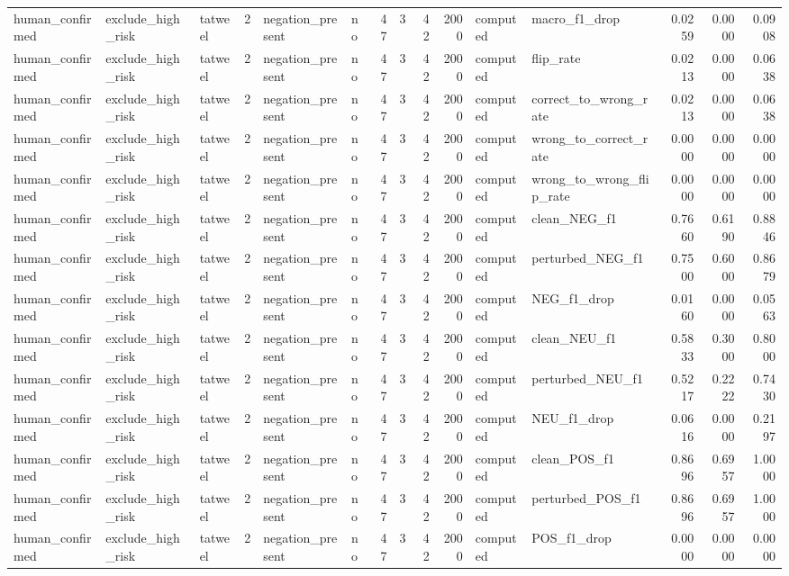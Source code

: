 \begin{tabular}{lllrllrrrrllrrr}
human_confirmed & exclude_high_risk & tatweel & 2 & negation_present & no & 47 & 3 & 42 & 2000 & computed & macro_f1_drop & 0.0259 & 0.0000 & 0.0908 \\
human_confirmed & exclude_high_risk & tatweel & 2 & negation_present & no & 47 & 3 & 42 & 2000 & computed & flip_rate & 0.0213 & 0.0000 & 0.0638 \\
human_confirmed & exclude_high_risk & tatweel & 2 & negation_present & no & 47 & 3 & 42 & 2000 & computed & correct_to_wrong_rate & 0.0213 & 0.0000 & 0.0638 \\
human_confirmed & exclude_high_risk & tatweel & 2 & negation_present & no & 47 & 3 & 42 & 2000 & computed & wrong_to_correct_rate & 0.0000 & 0.0000 & 0.0000 \\
human_confirmed & exclude_high_risk & tatweel & 2 & negation_present & no & 47 & 3 & 42 & 2000 & computed & wrong_to_wrong_flip_rate & 0.0000 & 0.0000 & 0.0000 \\
human_confirmed & exclude_high_risk & tatweel & 2 & negation_present & no & 47 & 3 & 42 & 2000 & computed & clean_NEG_f1 & 0.7660 & 0.6190 & 0.8846 \\
human_confirmed & exclude_high_risk & tatweel & 2 & negation_present & no & 47 & 3 & 42 & 2000 & computed & perturbed_NEG_f1 & 0.7500 & 0.6000 & 0.8679 \\
human_confirmed & exclude_high_risk & tatweel & 2 & negation_present & no & 47 & 3 & 42 & 2000 & computed & NEG_f1_drop & 0.0160 & 0.0000 & 0.0563 \\
human_confirmed & exclude_high_risk & tatweel & 2 & negation_present & no & 47 & 3 & 42 & 2000 & computed & clean_NEU_f1 & 0.5833 & 0.3000 & 0.8000 \\
human_confirmed & exclude_high_risk & tatweel & 2 & negation_present & no & 47 & 3 & 42 & 2000 & computed & perturbed_NEU_f1 & 0.5217 & 0.2222 & 0.7430 \\
human_confirmed & exclude_high_risk & tatweel & 2 & negation_present & no & 47 & 3 & 42 & 2000 & computed & NEU_f1_drop & 0.0616 & 0.0000 & 0.2197 \\
human_confirmed & exclude_high_risk & tatweel & 2 & negation_present & no & 47 & 3 & 42 & 2000 & computed & clean_POS_f1 & 0.8696 & 0.6957 & 1.0000 \\
human_confirmed & exclude_high_risk & tatweel & 2 & negation_present & no & 47 & 3 & 42 & 2000 & computed & perturbed_POS_f1 & 0.8696 & 0.6957 & 1.0000 \\
human_confirmed & exclude_high_risk & tatweel & 2 & negation_present & no & 47 & 3 & 42 & 2000 & computed & POS_f1_drop & 0.0000 & 0.0000 & 0.0000 \\

\end{tabular}
